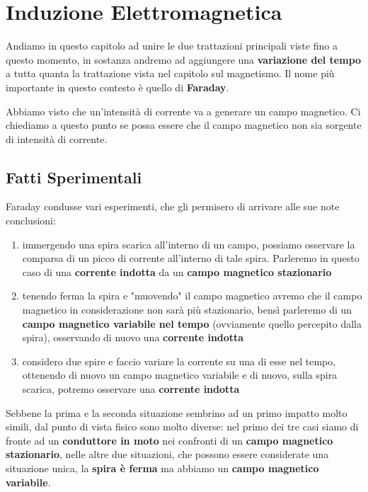 \chapter{Induzione Elettromagnetica}
Andiamo in questo capitolo ad unire le due trattazioni principali viste fino a questo momento, in sostanza andremo ad aggiungere una \textbf{variazione del tempo} a tutta quanta la trattazione vista nel capitolo sul magnetismo. Il nome più importante in questo contesto è quello di \textbf{Faraday}. 

Abbiamo visto che un'intensità di corrente va a generare un campo magnetico. Ci chiediamo a questo punto se possa essere che il campo magnetico non sia sorgente di intensità di corrente.

\section{Fatti Sperimentali}
Faraday condusse vari esperimenti, che gli permisero di arrivare alle sue note conclusioni: 

\begin{enumerate}
		\item immergendo una spira scarica all'interno di un campo, possiamo osservare la comparsa di un picco di corrente all'interno di tale spira. Parleremo in questo caso di una \textbf{corrente indotta} da un \textbf{campo magnetico stazionario}
	
	\item tenendo ferma la spira e "muovendo" il campo magnetico avremo che il campo magnetico in considerazione non sarà più stazionario, bensì parleremo di un \textbf{campo magnetico variabile nel tempo} (ovviamente quello percepito dalla spira), osservando di nuovo una \textbf{corrente indotta}
	
	\item considero due spire e faccio variare la corrente su una di esse nel tempo, ottenendo di nuovo un campo magnetico variabile e di nuovo, sulla spira scarica, potremo osservare una \textbf{corrente indotta}
\end{enumerate}

Sebbene la prima e la seconda situazione sembrino ad un primo impatto molto simili, dal punto di vista fisico sono molto diverse: nel primo dei tre casi siamo di fronte ad un \textbf{conduttore in moto} nei confronti di un \textbf{campo magnetico stazionario}, nelle altre due situazioni, che possono essere considerate una situazione unica, la \textbf{spira è ferma} ma abbiamo un \textbf{campo magnetico variabile}. 


